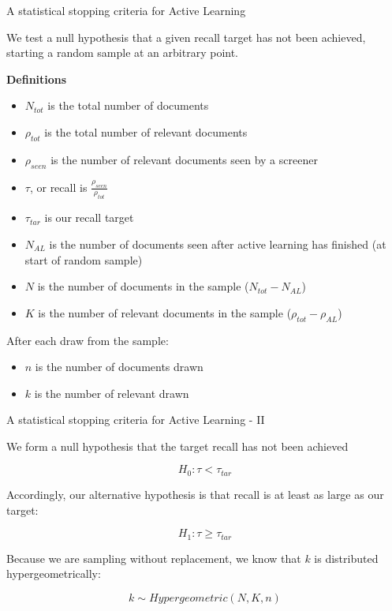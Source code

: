 \documentclass[9pt, aspectratio=169]{beamer}
\begin{document}
\begin{frame}{A statistical stopping criteria for Active Learning}

We test a null hypothesis that a given recall target has not been achieved, starting a random sample at an arbitrary point. 

\textbf{Definitions}

\begin{itemize}
	\item $N_{tot}$ is the total number of documents
	\item $\rho_{tot}$ is the total number of relevant documents
	\item $\rho_{seen}$ is the number of relevant documents seen by a screener
	\item $\tau$, or recall is $\frac{\rho_{seen}}{\rho_{tot}}$
	\item $\tau_{tar}$ is our recall target
	\item $N_{AL}$ is the number of documents seen after active learning has finished (at start of random sample)
	\item $N$ is the number of documents in the sample ($N_{tot} - N_{AL}$)
	\item $K$ is the number of relevant documents in the sample ($\rho_{tot} - \rho_{AL}$)
\end{itemize}

After each draw from the sample:

\begin{itemize}
	\item $n$ is the number of documents drawn
	\item $k$ is the number of relevant drawn
\end{itemize}

\end{frame}

\begin{frame}{A statistical stopping criteria for Active Learning - II}

We form a null hypothesis that the target recall has not been achieved

\begin{equation}
H_0 : \tau < \tau_{tar}
\label{eq:null_hypothesis}
\end{equation}

Accordingly, our alternative hypothesis is that recall is at least as large as our target:

\begin{equation}
H_1 : \tau \geq \tau_{tar}
\end{equation}

Because we are sampling without replacement, we know that $k$ is distributed hypergeometrically:

\begin{equation}
k \sim Hypergeometric(N, K, n)
\end{equation}

\end{frame}
\end{document}
